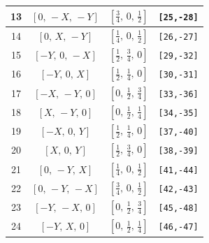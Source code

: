 \documentclass[fleqn,8pt]{jsarticle}
\begin{document}
\begin{longtable}{cccc}
13 & $\left[ 0,\, - X,\, - Y \right]$ & $\left[ \frac{3}{4},\, 0,\, \frac{1}{2} \right]$ & {\tt [25,-28]} \\ \hline
14 & $\left[ 0,\, X,\, - Y \right]$ & $\left[ \frac{1}{4},\, 0,\, \frac{1}{2} \right]$ & {\tt [26,-27]} \\ \hline
15 & $\left[ - Y,\, 0,\, - X \right]$ & $\left[ \frac{1}{2},\, \frac{3}{4},\, 0 \right]$ & {\tt [29,-32]} \\ \hline
16 & $\left[ - Y,\, 0,\, X \right]$ & $\left[ \frac{1}{2},\, \frac{1}{4},\, 0 \right]$ & {\tt [30,-31]} \\ \hline
17 & $\left[ - X,\, - Y,\, 0 \right]$ & $\left[ 0,\, \frac{1}{2},\, \frac{3}{4} \right]$ & {\tt [33,-36]} \\ \hline
18 & $\left[ X,\, - Y,\, 0 \right]$ & $\left[ 0,\, \frac{1}{2},\, \frac{1}{4} \right]$ & {\tt [34,-35]} \\ \hline
19 & $\left[ - X,\, 0,\, Y \right]$ & $\left[ \frac{1}{2},\, \frac{1}{4},\, 0 \right]$ & {\tt [37,-40]} \\ \hline
20 & $\left[ X,\, 0,\, Y \right]$ & $\left[ \frac{1}{2},\, \frac{3}{4},\, 0 \right]$ & {\tt [38,-39]} \\ \hline
21 & $\left[ 0,\, - Y,\, X \right]$ & $\left[ \frac{1}{4},\, 0,\, \frac{1}{2} \right]$ & {\tt [41,-44]} \\ \hline
22 & $\left[ 0,\, - Y,\, - X \right]$ & $\left[ \frac{3}{4},\, 0,\, \frac{1}{2} \right]$ & {\tt [42,-43]} \\ \hline
23 & $\left[ - Y,\, - X,\, 0 \right]$ & $\left[ 0,\, \frac{1}{2},\, \frac{3}{4} \right]$ & {\tt [45,-48]} \\ \hline
24 & $\left[ - Y,\, X,\, 0 \right]$ & $\left[ 0,\, \frac{1}{2},\, \frac{1}{4} \right]$ & {\tt [46,-47]} \\
\end{longtable}
\renewcommand{\arraystretch}{1.2}
\end{document}
